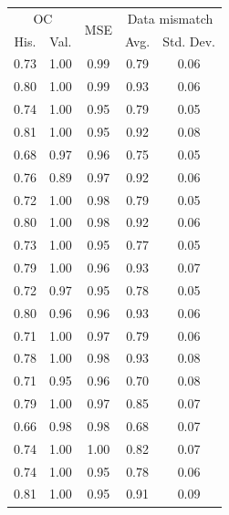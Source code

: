 \begin{tabular}{ccccc}
\toprule
\multicolumn{2}{c}{OC} & 
\multirow{2}{*}{
    MSE
} & 
\multicolumn{2}{c}{Data mismatch} 
\\
His. & Val. &  & Avg. & Std. Dev.
\\
\midrule
0.73 & 1.00 & 0.99 & 0.79 & 0.06 \\
0.80 & 1.00 & 0.99 & 0.93 & 0.06 \\
\midrule
0.74 & 1.00 & 0.95 & 0.79 & 0.05 \\
0.81 & 1.00 & 0.95 & 0.92 & 0.08 \\
\midrule
0.68 & 0.97 & 0.96 & 0.75 & 0.05 \\
0.76 & 0.89 & 0.97 & 0.92 & 0.06 \\
\midrule
0.72 & 1.00 & 0.98 & 0.79 & 0.05 \\
0.80 & 1.00 & 0.98 & 0.92 & 0.06 \\
\midrule
0.73 & 1.00 & 0.95 & 0.77 & 0.05 \\
0.79 & 1.00 & 0.96 & 0.93 & 0.07 \\
\midrule
0.72 & 0.97 & 0.95 & 0.78 & 0.05 \\
0.80 & 0.96 & 0.96 & 0.93 & 0.06 \\
\midrule
0.71 & 1.00 & 0.97 & 0.79 & 0.06 \\
0.78 & 1.00 & 0.98 & 0.93 & 0.08 \\
\midrule
0.71 & 0.95 & 0.96 & 0.70 & 0.08 \\
0.79 & 1.00 & 0.97 & 0.85 & 0.07 \\
\midrule
0.66 & 0.98 & 0.98 & 0.68 & 0.07 \\
0.74 & 1.00 & 1.00 & 0.82 & 0.07 \\
\midrule
0.74 & 1.00 & 0.95 & 0.78 & 0.06 \\
0.81 & 1.00 & 0.95 & 0.91 & 0.09 \\
\bottomrule
\end{tabular}
